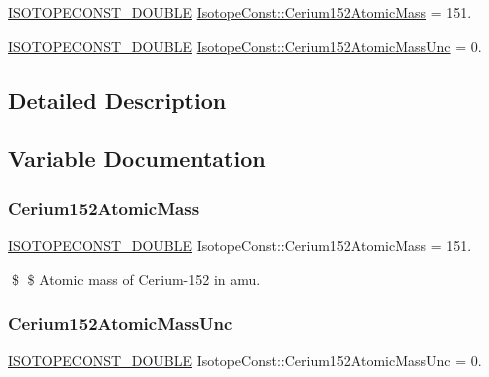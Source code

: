 \begin{DoxyCompactItemize}
\item 
\mbox{\hyperlink{group___isotope_const-_macros_ga8f45a7272ce02c0b4c65c44636ed719a}{I\+S\+O\+T\+O\+P\+E\+C\+O\+N\+S\+T\+\_\+\+D\+O\+U\+B\+LE}} \mbox{\hyperlink{group___isotope_const-_cerium-_ce152_ga60f81f029311b8d6bda13b7f7bd73f7c}{Isotope\+Const\+::\+Cerium152\+Atomic\+Mass}} = 151.
\item 
\mbox{\hyperlink{group___isotope_const-_macros_ga8f45a7272ce02c0b4c65c44636ed719a}{I\+S\+O\+T\+O\+P\+E\+C\+O\+N\+S\+T\+\_\+\+D\+O\+U\+B\+LE}} \mbox{\hyperlink{group___isotope_const-_cerium-_ce152_ga8819a7bdfe3348b5016c9c18f3065cdd}{Isotope\+Const\+::\+Cerium152\+Atomic\+Mass\+Unc}} = 0.
\end{DoxyCompactItemize}


\subsection{Detailed Description}


\subsection{Variable Documentation}
\mbox{\label{group___isotope_const-_cerium-_ce152_ga60f81f029311b8d6bda13b7f7bd73f7c}} 
\subsubsection{\texorpdfstring{Cerium152\+Atomic\+Mass}{Cerium152AtomicMass}}
{\footnotesize\ttfamily \mbox{\hyperlink{group___isotope_const-_macros_ga8f45a7272ce02c0b4c65c44636ed719a}{I\+S\+O\+T\+O\+P\+E\+C\+O\+N\+S\+T\+\_\+\+D\+O\+U\+B\+LE}} Isotope\+Const\+::\+Cerium152\+Atomic\+Mass = 151.}

\$ \$ Atomic mass of Cerium-\/152 in amu. \mbox{\label{group___isotope_const-_cerium-_ce152_ga8819a7bdfe3348b5016c9c18f3065cdd}} 
\subsubsection{\texorpdfstring{Cerium152\+Atomic\+Mass\+Unc}{Cerium152AtomicMassUnc}}
{\footnotesize\ttfamily \mbox{\hyperlink{group___isotope_const-_macros_ga8f45a7272ce02c0b4c65c44636ed719a}{I\+S\+O\+T\+O\+P\+E\+C\+O\+N\+S\+T\+\_\+\+D\+O\+U\+B\+LE}} Isotope\+Const\+::\+Cerium152\+Atomic\+Mass\+Unc = 0.}

